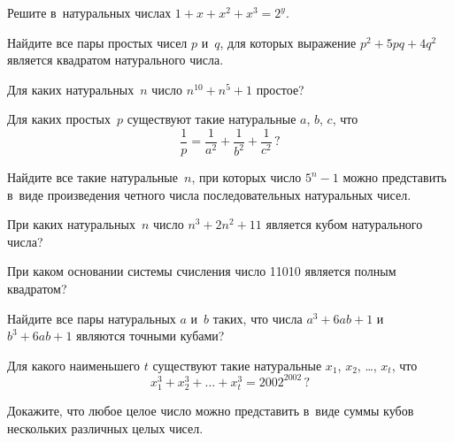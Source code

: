 


\begin{problems}

\item
Решите в~натуральных числах $1 + x + x^2 + x^3 = 2^y$.

\item
Найдите все пары простых чисел $p$ и~$q$, для которых выражение
$p^2 + 5 p q + 4 q^2$ является квадратом натурального числа.

\item
Для каких натуральных~$n$ число $n^{10} + n^5 + 1$ простое?

\item
Для каких простых~$p$ существуют такие натуральные $a$, $b$, $c$, что
\[
    \frac{1}{p}
=
    \frac{1}{a^2} + \frac{1}{b^2} + \frac{1}{c^2}
\, ? \]

\item
Найдите все такие натуральные~$n$, при которых число $5^{n} - 1$ можно
представить в~виде произведения четного числа последовательных натуральных
чисел.

\item
При каких натуральных~$n$ число $n^3 + 2 n^2 + 11$ является кубом натурального
числа?

\item
При каком основании системы счисления число 11010 является полным квадратом?

\item
Найдите все пары натуральных $a$ и~$b$ таких, что числа $a^3 + 6 a b + 1$
и~$b^3 + 6 a b + 1$ являются точными кубами?


\item
Для какого наименьшего $t$ существуют такие натуральные
$x_{1}$, $x_{2}$, \ldots, $x_{t}$, что
\[
    x_{1}^3 + x_{2}^3 + \ldots + x_{t}^3 = 2002^{2002}
\, ? \]

\item
Докажите, что любое целое число можно представить в~виде суммы кубов нескольких
различных целых чисел.

\end{problems}

